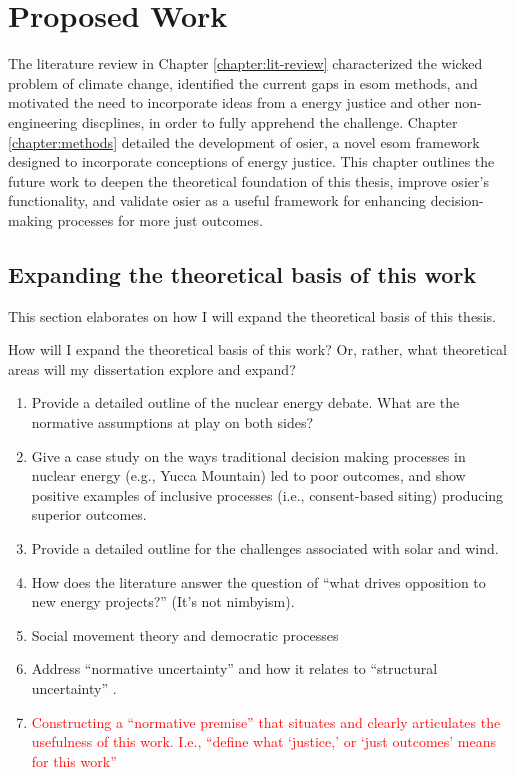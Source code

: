 \chapter{Proposed Work}

The literature review in Chapter \ref{chapter:lit-review} characterized the
wicked problem of climate change, identified the current gaps in \ac{esom}
methods, and motivated the need to incorporate ideas from a energy justice and
other non-engineering discplines, in order to fully apprehend the challenge.
Chapter \ref{chapter:methods} detailed the development of \ac{osier}, a novel
\ac{esom} framework designed to incorporate conceptions of energy justice. This
chapter outlines the future work to deepen the theoretical foundation of this
thesis, improve \ac{osier}'s functionality, and validate \ac{osier} as a useful
framework for enhancing decision-making processes for more just outcomes.

\section{Expanding the theoretical basis of this work}

This section elaborates on how I will expand the theoretical basis of this
thesis.

How will I expand the theoretical basis of this work? Or, rather, what
theoretical areas will my dissertation explore and expand?
\begin{enumerate}
    \item Provide a detailed outline of the nuclear energy debate. What are the
    normative assumptions at play on both sides?
    \item Give a case study on the ways traditional decision making processes in
    nuclear energy (e.g., Yucca Mountain) led to poor outcomes, and show
    positive examples of inclusive processes (i.e., consent-based siting)
    producing superior outcomes.
    \item Provide a detailed outline for the challenges associated with solar
    and wind.
    \item How does the literature answer the question of ``what drives
    opposition to new energy projects?'' (It's not \ac{nimbyism}).
    \item Social movement theory and democratic processes
    \item Address ``normative uncertainty'' \cite{van_uffelen_revisiting_2024}
    and how it relates to ``structural uncertainty''
    \cite{decarolis_using_2011}.
    \item \textcolor{red}{Constructing a ``normative premise'' that situates and
    clearly articulates the usefulness of this work. I.e., ``define what
    `justice,' or `just outcomes' means for this work''}
\end{enumerate}


